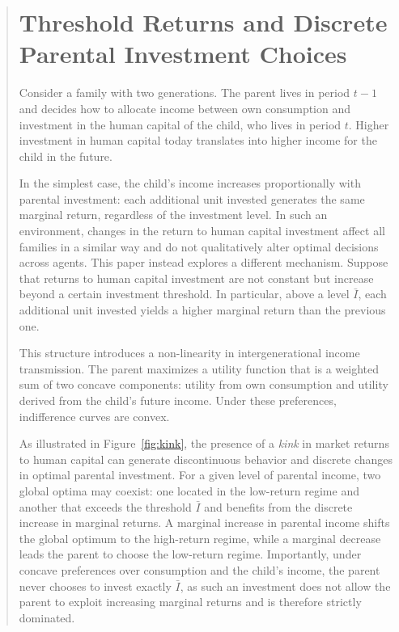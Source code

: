\documentclass[12pt]{article}
\begin{document}
\begin{abstract}



\section{Threshold Returns and Discrete Parental Investment Choices}

Consider a family with two generations. The parent lives in period $t-1$ and decides how to allocate income between own consumption and investment in the human capital of the child, who lives in period $t$. Higher investment in human capital today translates into higher income for the child in the future.

In the simplest case, the child’s income increases proportionally with parental investment: each additional unit invested generates the same marginal return, regardless of the investment level. In such an environment, changes in the return to human capital investment affect all families in a similar way and do not qualitatively alter optimal decisions across agents. This paper instead explores a different mechanism. Suppose that returns to human capital investment are not constant but increase beyond a certain investment threshold. In particular, above a level $\bar I$, each additional unit invested yields a higher marginal return than the previous one.

This structure introduces a non-linearity in intergenerational income transmission. The parent maximizes a utility function that is a weighted sum of two concave components: utility from own consumption and utility derived from the child’s future income. Under these preferences, indifference curves are convex.

As illustrated in Figure~\ref{fig:kink}, the presence of a \emph{kink} in market returns to human capital can generate discontinuous behavior and discrete changes in optimal parental investment. For a given level of parental income, two global optima may coexist: one located in the low-return regime and another that exceeds the threshold $\bar I$ and benefits from the discrete increase in marginal returns. A marginal increase in parental income shifts the global optimum to the high-return regime, while a marginal decrease leads the parent to choose the low-return regime. Importantly, under concave preferences over consumption and the child’s income, the parent never chooses to invest exactly $\bar I$, as such an investment does not allow the parent to exploit increasing marginal returns and is therefore strictly dominated.


\end{abstract}
\end{document}
